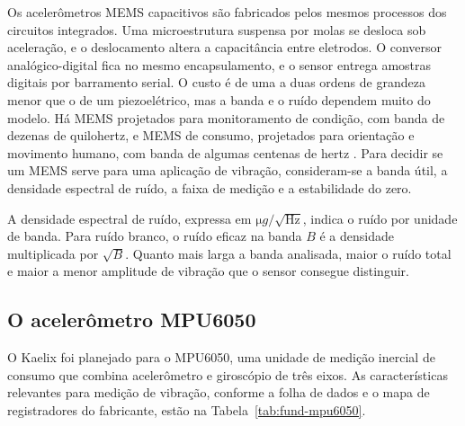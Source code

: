 Os acelerômetros MEMS capacitivos são fabricados pelos mesmos processos dos circuitos integrados. Uma microestrutura
suspensa por molas se desloca sob aceleração, e o deslocamento altera a capacitância entre eletrodos. O conversor
analógico-digital fica no mesmo encapsulamento, e o sensor entrega amostras digitais por barramento serial. O custo é de
uma a duas ordens de grandeza menor que o de um piezoelétrico, mas a banda e o ruído dependem muito do modelo. Há MEMS
projetados para monitoramento de condição, com banda de dezenas de quilohertz, e MEMS de consumo, projetados para orientação
e movimento humano, com banda de algumas centenas de hertz \cite{albarbar2008,fidali2024}. Para decidir se um MEMS serve
para uma aplicação de vibração, consideram-se a banda útil, a densidade espectral de ruído, a faixa de medição e a
estabilidade do zero.

A densidade espectral de ruído, expressa em $\si{\micro g}/\sqrt{\si{\hertz}}$, indica o ruído por unidade de banda. Para
ruído branco, o ruído eficaz na banda $B$ é a densidade multiplicada por $\sqrt{B}$. Quanto mais larga a banda analisada,
maior o ruído total e maior a menor amplitude de vibração que o sensor consegue distinguir.

\subsection{O acelerômetro MPU6050}
\label{sec:fund-mpu6050}

O Kaelix foi planejado para o MPU6050, uma unidade de medição inercial de consumo que combina acelerômetro e giroscópio de
três eixos. As características relevantes para medição de vibração, conforme a folha de dados e o mapa de registradores do
fabricante, estão na Tabela~\ref{tab:fund-mpu6050}.

\begin{table}[!htb]
\end{table}

